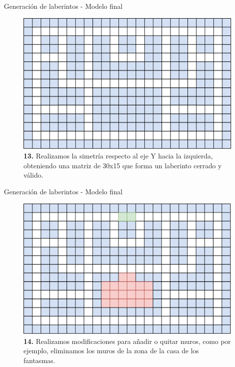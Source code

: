 \documentclass{beamer}
\begin{document}
    \begin{frame}{Generación de laberintos - Modelo final \scriptsize{\hfill \secname}}
        \begin{figure}[H]
        \centering
            \includegraphics[scale=0.475]{img/paso13.png}
            \caption{\textbf{13.} Realizamos la simetría respecto al eje Y hacia la izquierda, obteniendo una matriz de 30x15 que forma un laberinto cerrado y válido.}
        \end{figure}
    \end{frame}
    
    \begin{frame}{Generación de laberintos - Modelo final \scriptsize{\hfill \secname}}
        \begin{figure}[H]
        \centering
            \includegraphics[scale=0.475]{img/paso14.png}
            \caption{\textbf{14.} Realizamos modificaciones para añadir o quitar muros, como por ejemplo, eliminamos los muros de la zona de la casa de los fantasmas.}
        \end{figure}
    \end{frame}
    
\end{document}
